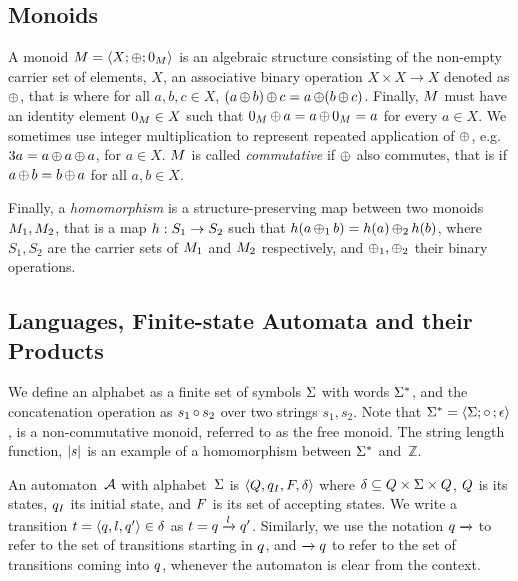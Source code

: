 \subsection{Monoids}



A monoid $M = \left\langle X;\operatorname{\oplus};0_{M}\right\rangle$ is an algebraic structure
consisting of the non-empty carrier set of elements, $X$, an associative binary operation
$X \times X \rightarrow X$ denoted as $\operatorname{\oplus}$, that is where for all $a, b,
c \in X$, $(a \operatorname{\oplus} b) \operatorname{\oplus} c = a \operatorname{\oplus} (b \operatorname{\oplus} c)$. Finally,
$M$ must have an identity element $0_{M} \in X$ such that
$0_{M} \operatorname{\oplus} a = a \operatorname{\oplus} 0_{M} =   a$ for every $a \in X$.
We sometimes use integer multiplication to represent repeated application of
$\operatorname{\oplus}$, e.g. $3a = a \operatorname{\oplus} a \operatorname{\oplus} a$, for $a \in X$. $M$ is
called \textit{commutative} if $\operatorname{\oplus}$ also commutes, that is if $a
\operatorname{\oplus} b = b \operatorname{\oplus} a$ for all $a, b \in X$. 

Finally, a \textit{homomorphism} is a structure-preserving map between two monoids
$M_1, M_2$, that is a map $h : S_1 \rightarrow S_2$ such that $h(a
\operatorname{\oplus}_1 b) = h(a) \operatorname{\oplus}_2 h(b)$, where $S_1, S_2$ are the carrier
sets of $M_1$ and $M_2$ respectively, and $\operatorname{\oplus}_1, \operatorname{\oplus}_2$
their binary operations.

\subsection{Languages, Finite-state Automata and their Products}

We define an alphabet as a finite set of symbols $\Sigma$ with words $\Sigma^*$, and
the concatenation operation as $s_1 \operatorname{\circ}{} s_2$ over two strings $s_1, s_2$.
Note that $\Sigma^* = \left\langle\Sigma;\operatorname{\circ}{};\epsilon\right\rangle$, is a
non-commutative monoid, referred to as the free monoid. The string length
function, $|s|$ is an example of a homomorphism between $\Sigma^*$
and~$\mathbb{Z}$.

An automaton~$\mathcal{A}$ with alphabet~$\Sigma$ is
$\left\langle Q, q_I, F, \delta\right\rangle$ where $\delta \subseteq Q \times \Sigma \times
Q$, $Q$ is its states, $q_I$ its
initial state, and $F$ is its set of accepting states.  We
write a transition $t = \left\langle q, l, q'\right\rangle \in
\delta$ as $t = q \xrightarrow{l} q'$.
Similarly, we use the notation $q \xrightarrow{}$ to refer to the set of
transitions starting in $q$, and $\xrightarrow{} q$ to refer to the
set of transitions coming into $q$, whenever the automaton is clear from
the context.

